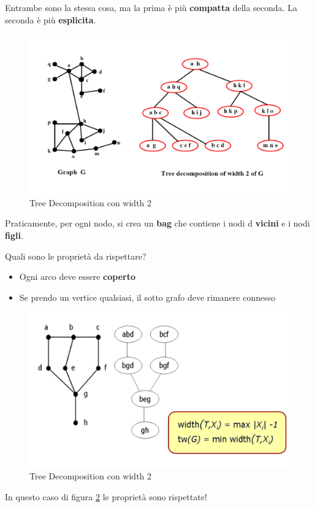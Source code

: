 Entrambe sono la stessa cosa, ma la prima è più \textbf{compatta} della
seconda. La seconda è più \textbf{esplicita}.

\begin{figure}[H]
    \centering
    \includegraphics[width=0.7\linewidth]{chapters/images/td.png}
    \caption{Tree Decomposition con width 2}
    \label{fig:7}
\end{figure}

Praticamente, per ogni nodo, si crea un \textbf{bag} che contiene i nodi d
\textbf{vicini} e i nodi \textbf{figli}.

Quali sono le proprietà da rispettare?
\begin{itemize}
    \item Ogni arco deve essere \textbf{coperto}
    \item Se prendo un vertice qualsiasi, il sotto grafo deve rimanere connesso
\end{itemize}
\begin{figure}[H]
    \centering
    \includegraphics[width=0.7\linewidth]{chapters/images/td2.png}
    \caption{Tree Decomposition con width 2}
    \label{fig:8}
\end{figure}

In questo caso di figura \ref{fig:8} le proprietà sono rispettate!

